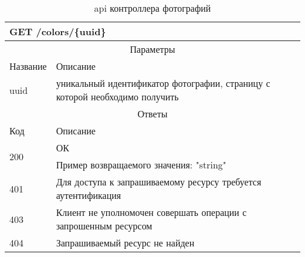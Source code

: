 \begin{table}[H]
  \caption{api контроллера фотографий}\label{use-case-15-table}
  \begin{tabular}{|p{6cm}|p{10cm}|}
  \hline \multicolumn{2}{|l|}{GET /colors/\{uuid\}} \\
  \hline \multicolumn{2}{|c|}{Параметры} \\
  \hline Название & Описание \\
  \hline uuid & уникальный идентификатор фотографии, страницу с которой необходимо получить \\
  \hline \multicolumn{2}{|c|}{Ответы} \\
  \hline Код & Описание \\
  \hline \multirow{2}{=}{200} & ОК \\
   & Пример возвращаемого значения: "string" \\
  \hline 401 & Для доступа к запрашиваемому ресурсу требуется аутентификация \\
  \hline 403 & Клиент не уполномочен совершать операции с запрошенным ресурсом \\
  \hline 404 & Запрашиваемый ресурс не найден \\
  \hline
  \end{tabular}
\end{table}

